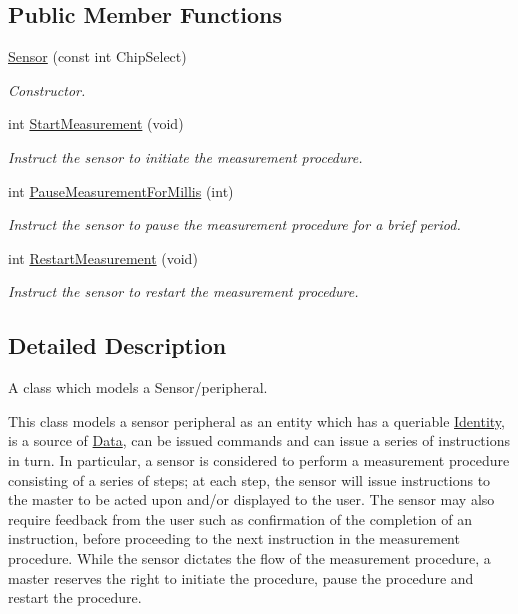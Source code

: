 \subsection*{Public Member Functions}
\begin{DoxyCompactItemize}
\item 
\mbox{\hyperlink{class_sensor_a370005d04d3566c21b9190e1442fa4e8}{Sensor}} (const int Chip\+Select)
\begin{DoxyCompactList}\small\item\em Constructor. \end{DoxyCompactList}\item 
int \mbox{\hyperlink{class_sensor_af0e64874a3d1b8ae19e3b623d244342a}{Start\+Measurement}} (void)
\begin{DoxyCompactList}\small\item\em Instruct the sensor to initiate the measurement procedure. \end{DoxyCompactList}\item 
int \mbox{\hyperlink{class_sensor_afdcc3b63357bd24f519e0cbc85454a52}{Pause\+Measurement\+For\+Millis}} (int)
\begin{DoxyCompactList}\small\item\em Instruct the sensor to pause the measurement procedure for a brief period. \end{DoxyCompactList}\item 
int \mbox{\hyperlink{class_sensor_ad58e9acfc23f07af433f0e2596d786d7}{Restart\+Measurement}} (void)
\begin{DoxyCompactList}\small\item\em Instruct the sensor to restart the measurement procedure. \end{DoxyCompactList}\end{DoxyCompactItemize}


\subsection{Detailed Description}
A class which models a Sensor/peripheral. 

This class models a sensor peripheral as an entity which has a queriable \mbox{\hyperlink{struct_identity}{Identity}}, is a source of \mbox{\hyperlink{struct_data}{Data}}, can be issued commands and can issue a series of instructions in turn. In particular, a sensor is considered to perform a measurement procedure consisting of a series of steps; at each step, the sensor will issue instructions to the master to be acted upon and/or displayed to the user. The sensor may also require feedback from the user such as confirmation of the completion of an instruction, before proceeding to the next instruction in the measurement procedure. While the sensor dictates the flow of the measurement procedure, a master reserves the right to initiate the procedure, pause the procedure and restart the procedure. 


